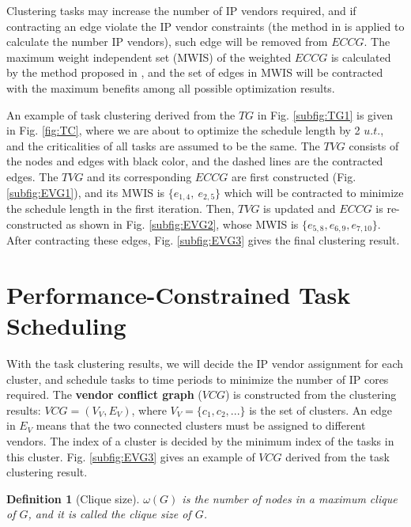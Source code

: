 \documentclass[conference]{IEEEtran}
\newtheorem{definition}{\textbf{Definition}}
\begin{document}
Clustering tasks may increase the number of IP vendors required, and if contracting an edge violate the IP vendor constraints (the method in \cite{article:NW} is applied to calculate the number IP vendors), such edge will be removed from $ECCG$. The maximum weight independent set (MWIS) of the weighted $ECCG$ is calculated by the method proposed in \cite{conference:XT}, and the set of edges in MWIS will be contracted with the maximum benefits among all possible optimization results.

An example of task clustering derived from the $TG$ in Fig. \ref{subfig:TG1} is given in Fig. \ref{fig:TC}, where we are about to optimize the schedule length by 2 $u.t.$, and the criticalities of all tasks are assumed to be the same. The $TVG$ consists of the nodes and edges with black color, and the dashed lines are the contracted edges. The $TVG$ and its corresponding $ECCG$ are first constructed (Fig. \ref{subfig:EVG1}), and its MWIS is $\{e_{1,4},~e_{2,5}\}$ which will be contracted to minimize the schedule length in the first iteration. Then, $TVG$ is updated and $ECCG$ is re-constructed as shown in Fig. \ref{subfig:EVG2}, whose MWIS is $\{e_{5,8}, e_{6,9}, e_{7,10}\}$. After contracting these edges, Fig. \ref{subfig:EVG3} gives the final clustering result.%


\section{Performance-Constrained Task Scheduling}

With the task clustering results, we will decide the IP vendor assignment for each cluster, and schedule tasks to time periods to minimize the number of IP cores required. The \textbf{vendor conflict graph} ($VCG$) is constructed from the clustering results: $VCG=(V_V, E_V)$, where $V_V=\{c_1, c_2, ...\}$ is the set of clusters. An edge in $E_V$ means that the two connected clusters must be assigned to different vendors. The index of a cluster is decided by the minimum index of the tasks in this cluster. Fig. \ref{subfig:EVG3} gives an example of $VCG$ derived from the task clustering result.


\begin{definition}[Clique size]
$\omega(G)$ is the number of nodes in a \textit{maximum clique} of $G$, and it is called the \textit{clique size} of $G$.
\end{definition}
\end{document}
